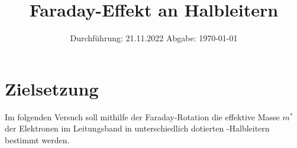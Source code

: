 

\subject{V46}
\title{Faraday-Effekt an Halbleitern}
\date{
    Durchführung: 21.11.2022
     \hspace{3em}
    Abgabe: \today %
}


\maketitle
\thispagestyle{empty}
\tableofcontents
\newpage

\section{Zielsetzung}

Im folgenden Versuch soll mithilfe der Faraday-Rotation die effektive Masse $m^*$ der Elektronen im Leitungsband in unterschiedlich dotierten -Halbleitern bestimmt werden.


\clearpage


\clearpage


\clearpage


\clearpage

\printbibliography



